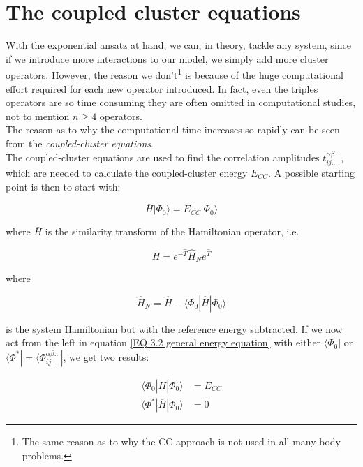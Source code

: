 \documentclass[10pt]{report}
\begin{document}
	\section{The coupled cluster equations}
	With the exponential ansatz at hand, we can, in theory, tackle any system, since if we introduce more interactions to our model, we simply add more cluster operators. However, the reason we don't\footnote{The same reason as to why the CC approach is not used in all many-body problems.} is because of the huge computational effort required for each new operator introduced. In fact, even the triples operators are so time consuming they are often omitted in computational studies, not to mention $n\geq 4$ operators.\\
	The reason as to why the computational time increases so rapidly can be seen from the \emph{coupled-cluster equations}.\\
	
	The coupled-cluster equations are used to find the correlation amplitudes $t_{ij\ldots}^{\alpha\beta\ldots}$, which are needed to calculate the coupled-cluster energy $E_{CC}$. A possible starting point is then to start with:
	
	\begin{equation}
		\overbar{H}|\Phi_0\rangle = E_{CC}|\Phi_0\rangle
		\label{EQ 3.2 general energy equation}
	\end{equation}
	
	where $\bar{H}$ is the similarity transform of the Hamiltonian operator, i.e.
	
	\begin{equation}
		\overbar{H} = e^{-\hat{T}}\hat{H}_Ne^{\hat{T}}
	\end{equation}
	
	
	where
	
	\begin{equation}
		\hat{H}_N = \hat{H} - \langle\Phi_0|\hat{H}|\Phi_0\rangle
	\end{equation}
	
	is the system Hamiltonian but with the reference energy subtracted. If we now act from the left in equation \ref{EQ 3.2 general energy equation} with either $\langle\Phi_0|$ or $\langle\Phi^*| = \langle\Phi_{ij\ldots}^{\alpha\beta\ldots}|$, we get two results:
	
	\begin{align}
	\langle\Phi_0|\overbar{H}|\Phi_0\rangle &= E_{CC}
	\label{EQ 3.2 general CC equation for energy}\\
	\langle\Phi^*|\overbar{H}|\Phi_0\rangle &= 0
	\label{EQ 3.3 general CC equation for amplitudes}
	\end{align}
	
\end{document}
